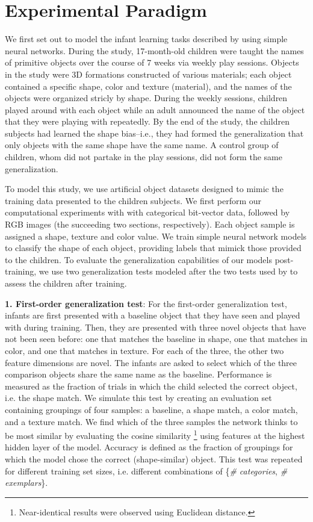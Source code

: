 \section{Experimental Paradigm}
\label{sec:experimental_paradigm}
We first set out to model the infant learning tasks described by
\citet{Smith2002} using simple neural networks. During the study, 17-month-old
children were taught the names of primitive objects over the course of 7 weeks
via weekly play sessions. Objects in the study were 3D formations constructed of
various materials; each object contained a specific shape, color
and texture (material), and the names of the objects were organized stricly
by shape. During the weekly sessions, children played around with each object
while an adult announced the name of the object that they were playing with
repeatedly. By the end of the study, the children subjects had learned the
shape bias--i.e., they had formed the generalization that only objects with
the same shape have the same name. A control group of children, whom did not
partake in the play sessions, did not form the same generalization.

To model this study, we use artificial object datasets designed to
mimic the training data presented to the children subjects. We first perform
our computational experiments with with categorical bit-vector data, followed by
RGB images (the succeeding two sections, respectively). Each object sample is
assigned a shape, texture and color value. We train simple neural network
models to classify the shape of each object, providing labels that mimick
those provided to the children. To evaluate the generalization capabilities of
our models post-training, we use two generalization tests modeled after the two
tests used by \citet{Smith2002} to assess the children after training.

{\bf1. First-order generalization test}: For the first-order generalization
test, infants are first presented with a baseline object that they have seen and
played with during training. Then, they are presented with three novel objects
that have not been seen before: one that matches the baseline in shape, one
that matches in color, and one that matches in texture. For each of the three,
the other two feature dimensions are novel. The infants are asked to select
which of the three comparison objects share the same name as the baseline.
Performance is measured as the fraction of trials in which the child
selected the correct object, i.e. the shape match. We simulate this test by
creating an evaluation set containing groupings of four samples: a baseline, a
shape match, a color match, and a texture match. We find which of the three
samples the network thinks to be most similar by evaluating the cosine similarity
\footnote{Near-identical results were observed using Euclidean distance.}
using features at the highest hidden layer of the model. Accuracy is defined as
the fraction of groupings for which the model chose the correct (shape-similar)
object. This test was repeated for different training set sizes, i.e. different
combinations of \{\textit{\# categories}, \textit{\# exemplars}\}.

